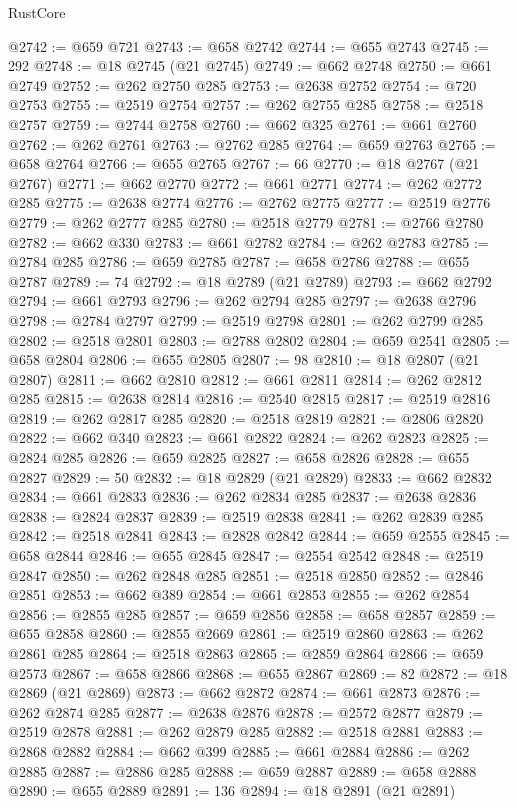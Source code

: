 \begin{lexlean}{RustCore}
\begin{coremodule}
@2742 := @659 @721
@2743 := @658 @2742
@2744 := @655 @2743
@2745 := 292
@2748 := @18 @2745 (@21 @2745)
@2749 := @662 @2748
@2750 := @661 @2749
@2752 := @262 @2750 @285
@2753 := @2638 @2752
@2754 := @720 @2753
@2755 := @2519 @2754
@2757 := @262 @2755 @285
@2758 := @2518 @2757
@2759 := @2744 @2758
@2760 := @662 @325
@2761 := @661 @2760
@2762 := @262 @2761
@2763 := @2762 @285
@2764 := @659 @2763
@2765 := @658 @2764
@2766 := @655 @2765
@2767 := 66
@2770 := @18 @2767 (@21 @2767)
@2771 := @662 @2770
@2772 := @661 @2771
@2774 := @262 @2772 @285
@2775 := @2638 @2774
@2776 := @2762 @2775
@2777 := @2519 @2776
@2779 := @262 @2777 @285
@2780 := @2518 @2779
@2781 := @2766 @2780
@2782 := @662 @330
@2783 := @661 @2782
@2784 := @262 @2783
@2785 := @2784 @285
@2786 := @659 @2785
@2787 := @658 @2786
@2788 := @655 @2787
@2789 := 74
@2792 := @18 @2789 (@21 @2789)
@2793 := @662 @2792
@2794 := @661 @2793
@2796 := @262 @2794 @285
@2797 := @2638 @2796
@2798 := @2784 @2797
@2799 := @2519 @2798
@2801 := @262 @2799 @285
@2802 := @2518 @2801
@2803 := @2788 @2802
@2804 := @659 @2541
@2805 := @658 @2804
@2806 := @655 @2805
@2807 := 98
@2810 := @18 @2807 (@21 @2807)
@2811 := @662 @2810
@2812 := @661 @2811
@2814 := @262 @2812 @285
@2815 := @2638 @2814
@2816 := @2540 @2815
@2817 := @2519 @2816
@2819 := @262 @2817 @285
@2820 := @2518 @2819
@2821 := @2806 @2820
@2822 := @662 @340
@2823 := @661 @2822
@2824 := @262 @2823
@2825 := @2824 @285
@2826 := @659 @2825
@2827 := @658 @2826
@2828 := @655 @2827
@2829 := 50
@2832 := @18 @2829 (@21 @2829)
@2833 := @662 @2832
@2834 := @661 @2833
@2836 := @262 @2834 @285
@2837 := @2638 @2836
@2838 := @2824 @2837
@2839 := @2519 @2838
@2841 := @262 @2839 @285
@2842 := @2518 @2841
@2843 := @2828 @2842
@2844 := @659 @2555
@2845 := @658 @2844
@2846 := @655 @2845
@2847 := @2554 @2542
@2848 := @2519 @2847
@2850 := @262 @2848 @285
@2851 := @2518 @2850
@2852 := @2846 @2851
@2853 := @662 @389
@2854 := @661 @2853
@2855 := @262 @2854
@2856 := @2855 @285
@2857 := @659 @2856
@2858 := @658 @2857
@2859 := @655 @2858
@2860 := @2855 @2669
@2861 := @2519 @2860
@2863 := @262 @2861 @285
@2864 := @2518 @2863
@2865 := @2859 @2864
@2866 := @659 @2573
@2867 := @658 @2866
@2868 := @655 @2867
@2869 := 82
@2872 := @18 @2869 (@21 @2869)
@2873 := @662 @2872
@2874 := @661 @2873
@2876 := @262 @2874 @285
@2877 := @2638 @2876
@2878 := @2572 @2877
@2879 := @2519 @2878
@2881 := @262 @2879 @285
@2882 := @2518 @2881
@2883 := @2868 @2882
@2884 := @662 @399
@2885 := @661 @2884
@2886 := @262 @2885
@2887 := @2886 @285
@2888 := @659 @2887
@2889 := @658 @2888
@2890 := @655 @2889
@2891 := 136
@2894 := @18 @2891 (@21 @2891)

\end{coremodule}
\end{lexlean}
